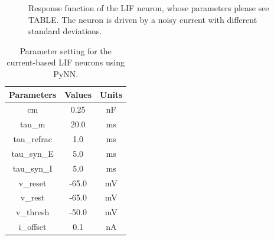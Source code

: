 \documentclass[runningheads,a4paper]{llncs}
\begin{document}
\begin{figure}[bt!]
	\centering
	\caption{
	Response function of the LIF neuron, whose parameters please see TABLE.
	The neuron is driven by a noisy current with different standard deviations. }
	\label{fig:firefunc}	
\end{figure}
\begin{table}[hbbp]
	\centering
	\caption{\label{tbl:pynnSetting}Parameter setting for the current-based LIF neurons using PyNN.}
	\bgroup
	\def\arraystretch{1.4}
	\begin{tabular}{c c c}
		Parameters & Values & Units \\
		\hline
		cm & 0.25 & nF	\\
		tau\_m & 20.0 & ms\\
		tau\_refrac & 1.0 & ms\\
		tau\_syn\_E & 5.0 & ms\\
		tau\_syn\_I & 5.0 & ms\\
		v\_reset & -65.0 & mV\\
		v\_rest & -65.0 & mV\\
		v\_thresh & -50.0 & mV\\
		i\_offset & 0.1 & nA\\
	\end{tabular}
	\egroup
\end{table}
\end{document}
